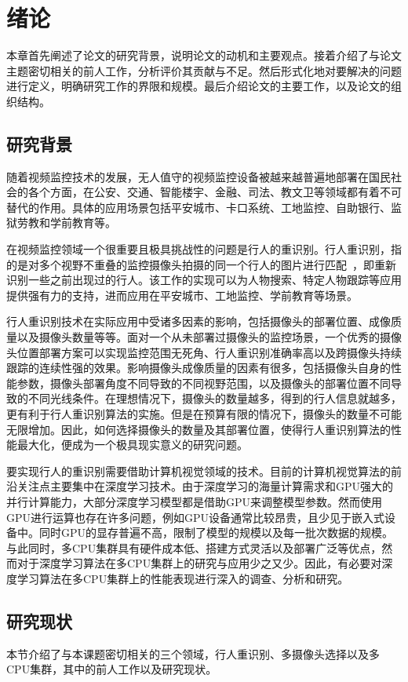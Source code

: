 \chapter{绪论}\label{sec:introduction}

本章首先阐述了论文的研究背景，说明论文的动机和主要观点。接着介绍了与论文主题密切相关的前人工作，分析评价其贡献与不足。然后形式化地对要解决的问题进行定义，明确研究工作的界限和规模。最后介绍论文的主要工作，以及论文的组织结构。

\section{研究背景}

随着视频监控技术的发展，无人值守的视频监控设备被越来越普遍地部署在国民社会的各个方面，在公安、交通、智能楼宇、金融、司法、教文卫等领域都有着不可替代的作用。具体的应用场景包括平安城市、卡口系统、工地监控、自助银行、监狱劳教和学前教育等。

在视频监控领域一个很重要且极具挑战性的问题是行人的重识别。行人重识别，指的是对多个视野不重叠的监控摄像头拍摄的同一个行人的图片进行匹配~\cite{chen2018person}，即重新识别一些之前出现过的行人。该工作的实现可以为人物搜索、特定人物跟踪等应用提供强有力的支持，进而应用在平安城市、工地监控、学前教育等场景。

行人重识别技术在实际应用中受诸多因素的影响，包括摄像头的部署位置、成像质量以及摄像头数量等等。面对一个从未部署过摄像头的监控场景，一个优秀的摄像头位置部署方案可以实现监控范围无死角、行人重识别准确率高以及跨摄像头持续跟踪的连续性强的效果。影响摄像头成像质量的因素有很多，包括摄像头自身的性能参数，摄像头部署角度不同导致的不同视野范围，以及摄像头的部署位置不同导致的不同光线条件。在理想情况下，摄像头的数量越多，得到的行人信息就越多，更有利于行人重识别算法的实施。但是在预算有限的情况下，摄像头的数量不可能无限增加。因此，如何选择摄像头的数量及其部署位置，使得行人重识别算法的性能最大化，便成为一个极具现实意义的研究问题。

要实现行人的重识别需要借助计算机视觉领域的技术。目前的计算机视觉算法的前沿关注点主要集中在深度学习技术。由于深度学习的海量计算需求和GPU强大的并行计算能力，大部分深度学习模型都是借助GPU来调整模型参数。然而使用GPU进行运算也存在许多问题，例如GPU设备通常比较昂贵，且少见于嵌入式设备中。同时GPU的显存普遍不高，限制了模型的规模以及每一批次数据的规模。与此同时，多CPU集群具有硬件成本低、搭建方式灵活以及部署广泛等优点，然而对于深度学习算法在多CPU集群上的研究与应用少之又少。因此，有必要对深度学习算法在多CPU集群上的性能表现进行深入的调查、分析和研究。

\section{研究现状}
本节介绍了与本课题密切相关的三个领域，行人重识别、多摄像头选择以及多CPU集群，其中的前人工作以及研究现状。


